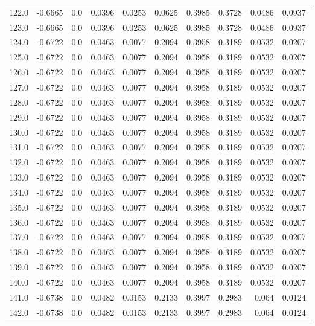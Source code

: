 \begin{longtable}{lrrrrrrrrr}
122.0 & -0.6665 & 0.0 & 0.0396 & 0.0253 & 0.0625 & 0.3985 & 0.3728 & 0.0486 & 0.0937 \\
123.0 & -0.6665 & 0.0 & 0.0396 & 0.0253 & 0.0625 & 0.3985 & 0.3728 & 0.0486 & 0.0937 \\
124.0 & -0.6722 & 0.0 & 0.0463 & 0.0077 & 0.2094 & 0.3958 & 0.3189 & 0.0532 & 0.0207 \\
125.0 & -0.6722 & 0.0 & 0.0463 & 0.0077 & 0.2094 & 0.3958 & 0.3189 & 0.0532 & 0.0207 \\
126.0 & -0.6722 & 0.0 & 0.0463 & 0.0077 & 0.2094 & 0.3958 & 0.3189 & 0.0532 & 0.0207 \\
127.0 & -0.6722 & 0.0 & 0.0463 & 0.0077 & 0.2094 & 0.3958 & 0.3189 & 0.0532 & 0.0207 \\
128.0 & -0.6722 & 0.0 & 0.0463 & 0.0077 & 0.2094 & 0.3958 & 0.3189 & 0.0532 & 0.0207 \\
129.0 & -0.6722 & 0.0 & 0.0463 & 0.0077 & 0.2094 & 0.3958 & 0.3189 & 0.0532 & 0.0207 \\
130.0 & -0.6722 & 0.0 & 0.0463 & 0.0077 & 0.2094 & 0.3958 & 0.3189 & 0.0532 & 0.0207 \\
131.0 & -0.6722 & 0.0 & 0.0463 & 0.0077 & 0.2094 & 0.3958 & 0.3189 & 0.0532 & 0.0207 \\
132.0 & -0.6722 & 0.0 & 0.0463 & 0.0077 & 0.2094 & 0.3958 & 0.3189 & 0.0532 & 0.0207 \\
133.0 & -0.6722 & 0.0 & 0.0463 & 0.0077 & 0.2094 & 0.3958 & 0.3189 & 0.0532 & 0.0207 \\
134.0 & -0.6722 & 0.0 & 0.0463 & 0.0077 & 0.2094 & 0.3958 & 0.3189 & 0.0532 & 0.0207 \\
135.0 & -0.6722 & 0.0 & 0.0463 & 0.0077 & 0.2094 & 0.3958 & 0.3189 & 0.0532 & 0.0207 \\
136.0 & -0.6722 & 0.0 & 0.0463 & 0.0077 & 0.2094 & 0.3958 & 0.3189 & 0.0532 & 0.0207 \\
137.0 & -0.6722 & 0.0 & 0.0463 & 0.0077 & 0.2094 & 0.3958 & 0.3189 & 0.0532 & 0.0207 \\
138.0 & -0.6722 & 0.0 & 0.0463 & 0.0077 & 0.2094 & 0.3958 & 0.3189 & 0.0532 & 0.0207 \\
139.0 & -0.6722 & 0.0 & 0.0463 & 0.0077 & 0.2094 & 0.3958 & 0.3189 & 0.0532 & 0.0207 \\
140.0 & -0.6722 & 0.0 & 0.0463 & 0.0077 & 0.2094 & 0.3958 & 0.3189 & 0.0532 & 0.0207 \\
141.0 & -0.6738 & 0.0 & 0.0482 & 0.0153 & 0.2133 & 0.3997 & 0.2983 & 0.064 & 0.0124 \\
142.0 & -0.6738 & 0.0 & 0.0482 & 0.0153 & 0.2133 & 0.3997 & 0.2983 & 0.064 & 0.0124 \\

\end{longtable}
